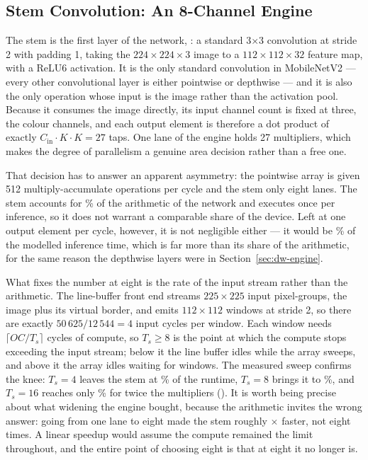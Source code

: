 \subsection{Stem Convolution: An 8-Channel Engine}
\label{sec:stem-engine}

The stem is the first layer of the network, : a standard
3$\times$3 convolution at stride 2 with padding 1, taking the
$224 \times 224 \times 3$ image to a $112 \times 112 \times 32$ feature map,
with a ReLU6 activation. It is the only standard convolution in MobileNetV2 ---
every other convolutional layer is either pointwise or depthwise --- and it is
also the only operation whose input is the image rather than the activation
pool. Because it consumes the image directly, its input channel count is fixed
at three, the colour channels, and each output element is therefore a dot
product of exactly $C_{\mathrm{in}} \cdot K \cdot K = 27$ taps. One lane of the
engine holds 27 multipliers, which makes the degree of parallelism a genuine
area decision rather than a free one.

That decision has to answer an apparent asymmetry: the pointwise array is
given 512 multiply-accumulate operations per cycle and the stem only eight
lanes. The stem accounts for \thStemMacPct\% of the arithmetic of the network
and executes once per inference, so it does not warrant a comparable share of
the device. Left at one output element per cycle, however, it is not
negligible either --- it would be \thStemShareSeq\% of the modelled inference
time, which is far more than its share of the arithmetic, for the same reason
the depthwise layers were in Section~\ref{sec:dw-engine}.

What fixes the number at eight is the rate of the input stream rather than the
arithmetic. The line-buffer front end streams $225 \times 225$ input
pixel-groups, the image plus its virtual border, and emits $112 \times 112$
windows at stride 2, so there are exactly $50\,625 / 12\,544 = 4$ input cycles
per window. Each window needs $\lceil OC / T_s \rceil$ cycles of compute, so
$T_s \ge 8$ is the point at which the compute stops exceeding the input
stream; below it the line buffer idles while the array sweeps, and above it
the array idles waiting for windows. The measured sweep confirms the knee:
$T_s = 4$ leaves the stem at \thStemShareFour\% of the runtime, $T_s = 8$
brings it to \thStemShare\%, and $T_s = 16$ reaches only \thStemShareSixteen\%
for twice the multipliers (). It is worth being precise about what
widening the engine bought, because the arithmetic invites the wrong answer:
going from one lane to eight made the stem roughly
\thStemSpeedup$\times$ faster, not eight times. A linear speedup would assume
the compute remained the limit throughout, and the entire point of choosing
eight is that at eight it no longer is.

